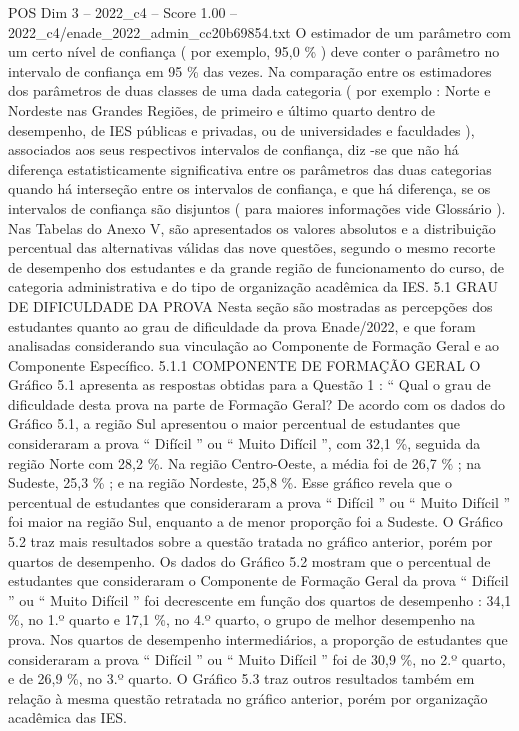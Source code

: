 \begin{textsample}{POS Dim 3 – 2022\_c4 – Score 1.00 – 2022\_c4/enade\_2022\_admin\_cc20b69854.txt}
O estimador de um parâmetro com um certo nível de confiança ( por exemplo, 95,0 \% ) deve conter o parâmetro no intervalo de confiança em 95 \% das vezes.
Na comparação entre os estimadores dos parâmetros de duas classes de uma dada categoria ( por exemplo : Norte e Nordeste nas Grandes Regiões, de primeiro e último quarto dentro de desempenho, de IES públicas e privadas, ou de universidades e faculdades ), associados aos seus respectivos intervalos de confiança, diz -se que não há diferença estatisticamente significativa entre os parâmetros das duas categorias quando há interseção entre os intervalos de confiança, e que há diferença, se os intervalos de confiança são disjuntos ( para maiores informações vide Glossário ).
Nas Tabelas do Anexo V, são apresentados os valores absolutos e a distribuição percentual das alternativas válidas das nove questões, segundo o mesmo recorte de desempenho dos estudantes e da grande região de funcionamento do curso, de categoria administrativa e do tipo de organização acadêmica da IES. 5.1 GRAU DE DIFICULDADE DA PROVA Nesta seção são mostradas as percepções dos estudantes quanto ao grau de dificuldade da prova Enade/2022, e que foram analisadas considerando sua vinculação ao Componente de Formação Geral e ao Componente Específico. 5.1.1 COMPONENTE DE FORMAÇÃO GERAL O Gráfico 5.1 apresenta as respostas obtidas para a Questão 1 : “ Qual o grau de dificuldade desta prova na parte de Formação Geral?
De acordo com os dados do Gráfico 5.1, a região Sul apresentou o maior percentual de estudantes que consideraram a prova “ Difícil ” ou “ Muito Difícil ”, com 32,1 \%, seguida da região Norte com 28,2 \%.
Na região Centro-Oeste, a média foi de 26,7 \% ; na Sudeste, 25,3 \% ; e na região Nordeste, 25,8 \%.
Esse gráfico revela que o percentual de estudantes que consideraram a prova “ Difícil ” ou “ Muito Difícil ” foi maior na região Sul, enquanto a de menor proporção foi a Sudeste.
O Gráfico 5.2 traz mais resultados sobre a questão tratada no gráfico anterior, porém por quartos de desempenho.
Os dados do Gráfico 5.2 mostram que o percentual de estudantes que consideraram o Componente de Formação Geral da prova “ Difícil ” ou “ Muito Difícil ” foi decrescente em função dos quartos de desempenho : 34,1 \%, no 1.º quarto e 17,1 \%, no 4.º quarto, o grupo de melhor desempenho na prova.
Nos quartos de desempenho intermediários, a proporção de estudantes que consideraram a prova “ Difícil ” ou “ Muito Difícil ” foi de 30,9 \%, no 2.º quarto, e de 26,9 \%, no 3.º quarto.
O Gráfico 5.3 traz outros resultados também em relação à mesma questão retratada no gráfico anterior, porém por organização acadêmica das IES.

\end{textsample}
